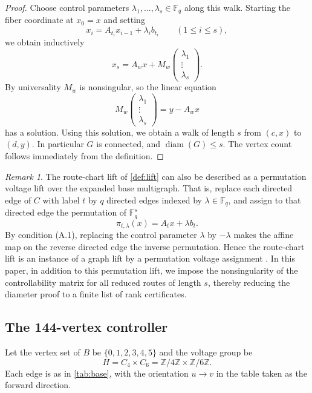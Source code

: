 \documentclass[11pt]{article}
\theoremstyle{definition}
\theoremstyle{remark}
\newtheorem*{remark}{Remark}
\renewcommand{\_}{\textunderscore\allowbreak}
\begin{document}
\begin{proof}
Choose control parameters \(\lambda_1,\ldots,\lambda_s\in\mathbb F_q\)
along this walk. Starting the fiber coordinate at \(x_0=x\) and setting
\[
  x_i=A_{t_i}x_{i-1}+\lambda_i b_{t_i}
  \qquad(1\le i\le s) ,
\] we obtain inductively \[
  x_s=A_wx+M_w
  \begin{pmatrix}\lambda_1\\ \vdots\\ \lambda_s\end{pmatrix} .
\] By universality \(M_w\) is nonsingular, so the linear equation \[
  M_w
  \begin{pmatrix}\lambda_1\\ \vdots\\ \lambda_s\end{pmatrix}
  =y-A_wx
\] has a solution. Using this solution, we obtain a walk of length \(s\)
from \((c,x)\) to \((d,y)\). In particular \(G\) is connected, and \(\operatorname{diam}(G)\le s\). The
vertex count follows immediately from the definition.
\end{proof}

\begin{remark}
The route-chart lift of \cref{def:lift} can also be
described as a permutation voltage lift over the expanded base
multigraph. That is, replace each directed edge of \(C\) with label
\(t\) by \(q\) directed edges indexed by \(\lambda\in\mathbb F_q\), and
assign to that directed edge the permutation of \(\mathbb F_q^s\) \[
  \pi_{t,\lambda}(x)=A_t x+\lambda b_t .
\] By condition (A.1), replacing the control parameter \(\lambda\) by
\(-\lambda\) makes the affine map on the reverse directed edge the
inverse permutation. Hence the route-chart lift is an instance of a
graph lift by a permutation voltage assignment \cite{GrossTucker2001,
DalfoEtAl2021}. In this paper, in addition to this permutation lift,
we impose the nonsingularity of the controllability matrix for all
reduced routes of length \(s\), thereby reducing the diameter proof to a
finite list of rank certificates.
\end{remark}

\subsection{The 144-vertex
controller}\label{a.5-the-144-vertex-controller}

Let the vertex set of \(B\) be \(\{0,1,2,3,4,5\}\) and the voltage group
be \[
  H=C_4\times C_6=\mathbb Z/4\mathbb Z\times\mathbb Z/6\mathbb Z .
\] Each edge is as in \cref{tab:base}, with the orientation \(u\to v\) in the
table taken as the forward direction.
\end{document}
